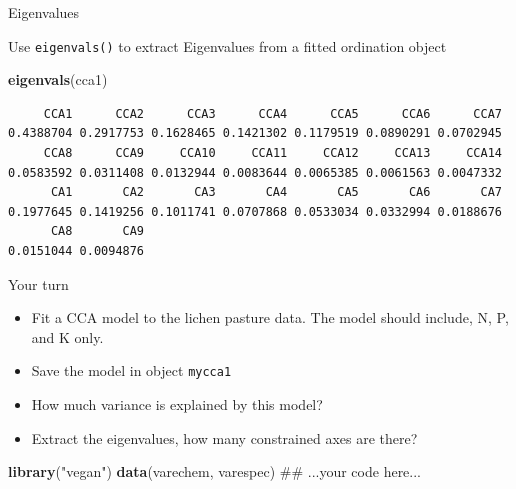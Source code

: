 \documentclass[10pt,ignorenonframetext,compress, aspectratio=169]{beamer}
\newenvironment{Shaded}{\begin{snugshade}}{\end{snugshade}}
\newcommand{\KeywordTok}[1]{\textcolor[rgb]{0.13,0.29,0.53}{\textbf{{#1}}}}
\newcommand{\StringTok}[1]{\textcolor[rgb]{0.31,0.60,0.02}{{#1}}}
\newcommand{\NormalTok}[1]{{#1}}
\providecommand{\tightlist}{%
  \setlength{\itemsep}{0pt}\setlength{\parskip}{0pt}}
\begin{document}
\begin{frame}[fragile]{Eigenvalues}

Use \texttt{eigenvals()} to extract Eigenvalues from a fitted ordination
object

\scriptsize

\begin{Shaded}
\begin{Highlighting}[]
\KeywordTok{eigenvals}\NormalTok{(cca1)}
\end{Highlighting}
\end{Shaded}

\begin{verbatim}
     CCA1      CCA2      CCA3      CCA4      CCA5      CCA6      CCA7 
0.4388704 0.2917753 0.1628465 0.1421302 0.1179519 0.0890291 0.0702945 
     CCA8      CCA9     CCA10     CCA11     CCA12     CCA13     CCA14 
0.0583592 0.0311408 0.0132944 0.0083644 0.0065385 0.0061563 0.0047332 
      CA1       CA2       CA3       CA4       CA5       CA6       CA7 
0.1977645 0.1419256 0.1011741 0.0707868 0.0533034 0.0332994 0.0188676 
      CA8       CA9 
0.0151044 0.0094876 
\end{verbatim}

\normalsize

\end{frame}

\begin{frame}[fragile]{Your turn}

\begin{itemize}
\tightlist
\item
  Fit a CCA model to the lichen pasture data. The model should include,
  N, P, and K only.
\item
  Save the model in object \texttt{mycca1}
\item
  How much variance is explained by this model?
\item
  Extract the eigenvalues, how many constrained axes are there?
\end{itemize}

\begin{Shaded}
\begin{Highlighting}[]
\KeywordTok{library}\NormalTok{(}\StringTok{"vegan"}\NormalTok{)}
\KeywordTok{data}\NormalTok{(varechem, varespec)}
\NormalTok{## ...your code here...}
\end{Highlighting}
\end{Shaded}

\end{frame}
\end{document}
